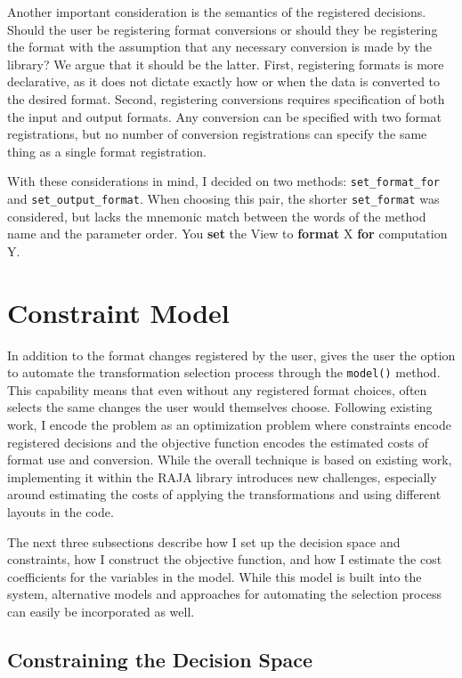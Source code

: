 Another important consideration is the semantics of the registered decisions. 
Should the user be registering format conversions or should they be registering the format with the assumption that any necessary conversion is made by the library?
We argue that it should be the latter.
First, registering formats is more declarative, as it does not dictate exactly how or when the data is converted to the desired format.
Second, registering conversions requires specification of both the input and output formats. 
Any conversion can be specified with two format registrations, but no number of conversion registrations can specify the same thing as a single format registration.

With these considerations in mind, I decided on two methods: \verb.set_format_for. and \verb.set_output_format..
When choosing this pair, the shorter \verb.set_format. was considered, but lacks the mnemonic match between the words of the method name and the parameter order. You \textbf{set} the View to \textbf{format} X \textbf{for} computation Y. 

\section{Constraint Model}

In addition to the format changes registered by the user, \FormatDecisions{} gives the user the option to automate the transformation selection process through the \verb.model(). method.
This capability means that even without any registered format choices, \FormatDecisions{} often selects the same changes the user would themselves choose.
Following existing work, I encode the problem as an optimization problem where constraints encode registered decisions and the objective function encodes the estimated costs of format use and conversion.
While the overall technique is based on existing work, implementing it within the RAJA library introduces new challenges, especially around estimating the costs of applying the transformations and using different layouts in the code.

The next three subsections describe how I set up the decision space and constraints, how I construct the objective function, and how I estimate the cost coefficients for the variables in the model.
While this model is built into the \FormatDecisions{} system, alternative models and approaches for automating the selection process can easily be incorporated as well.

\subsection{Constraining the Decision Space}

